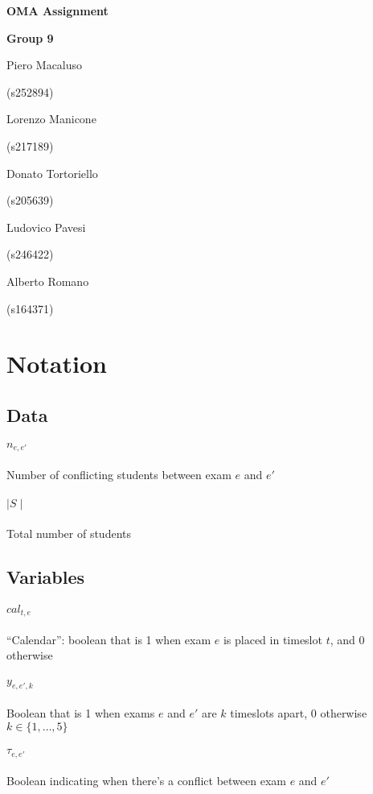 \documentclass[11pt, a4paper, leqno]{article}
\newcommand{\nome}[2]{
\begin{minipage}[t]{0.185\linewidth}
	\centering #1\par
	\centering\small (#2)\par
\end{minipage}
}
\begin{document}
	
	\begin{center}
		{\huge\textbf{OMA Assignment}}\par
		\vspace{0.3em}
		{\large\textbf{Group 9}}\par
		\vspace{1em}
		\nome{Piero Macaluso}{s252894}
		\nome{Lorenzo Manicone}{s217189}
		\nome{Donato Tortoriello}{s205639}
		\nome{Ludovico Pavesi}{s246422}
		\nome{Alberto Romano}{s164371}
	\end{center}
	
	\section{Notation}
	
	\subsection{Data}
	
	\paragraph{$n_{e,e'}$} Number of conflicting students between exam $e$ and $e'$
	
	\paragraph{$\mid S \mid$} Total number of students
	
	\subsection{Variables}
	
	\paragraph{$cal_{t,e}$} ``Calendar'': boolean that is 1 when exam $e$ is placed in timeslot $t$, and 0 otherwise
	
	\paragraph{$y_{e,e',k}$} Boolean that is 1 when exams $e$ and $e'$ are $k$ timeslots apart, 0 otherwise $k \in \{1,\dots,5\}$
	
	\paragraph{$\tau_{e,e'}$} Boolean indicating when there's a conflict between exam $e$ and $e'$
	
\end{document}
